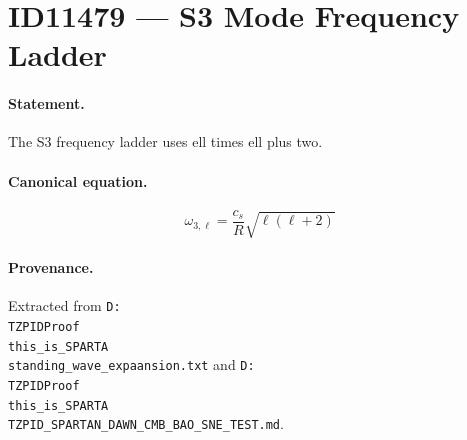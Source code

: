 \section*{ID11479 --- S3 Mode Frequency Ladder}

\paragraph{Statement.}
The S3 frequency ladder uses ell times ell plus two.

\paragraph{Canonical equation.}
\[
\omega_{3,\ell}=\frac{c_s}{R}\sqrt{\ell(\ell+2)}
\]

\paragraph{Provenance.}
Extracted from \texttt{D:\\TZPIDProof\\this\_is\_SPARTA\\standing\_wave\_expaansion.txt} and \texttt{D:\\TZPIDProof\\this\_is\_SPARTA\\TZPID\_SPARTAN\_DAWN\_CMB\_BAO\_SNE\_TEST.md}.
